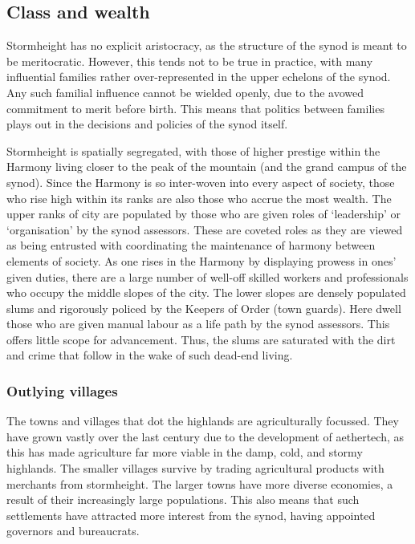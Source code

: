 \documentclass[a4paper,11pt,oneside]{book}
\begin{document}
\subsection{Class and wealth}
Stormheight has no explicit aristocracy, as the structure of the synod is meant to be meritocratic. However, this tends not to be true in practice, with many influential families rather over-represented in the upper echelons of the synod. Any such familial influence cannot be wielded openly, due to the avowed commitment to merit before birth. This means that politics between families plays out in the decisions and policies of the synod itself. 

Stormheight is spatially segregated, with those of higher prestige within the Harmony living closer to the peak of the mountain (and the grand campus of the synod). Since the Harmony is so inter-woven into every aspect of society, those who rise high within its ranks are also those who accrue the most wealth. The upper ranks of city are populated by those who are given roles of `leadership' or `organisation' by the synod assessors. These are coveted roles as they are viewed as being entrusted with coordinating the maintenance of harmony between elements of society. As one rises in the Harmony by displaying prowess in ones' given duties, there are a large number of well-off skilled workers and professionals who occupy the middle slopes of the city. The lower slopes are densely populated slums and rigorously policed by the Keepers of Order (town guards). Here dwell those who are given manual labour as a life path by the synod assessors. This offers little scope for advancement. Thus, the slums are saturated with the dirt and crime that follow in the wake of such dead-end living.   

\subsubsection{Outlying villages}
The towns and villages that dot the highlands are agriculturally focussed. They have grown vastly over the last century due to the development of aethertech, as this has made agriculture far more viable in the damp, cold, and stormy highlands. The smaller villages survive by trading agricultural products with merchants from stormheight. The larger towns have more diverse economies, a result of their increasingly large populations. This also means that such settlements have attracted more interest from the synod, having appointed governors and bureaucrats. 
\end{document}

